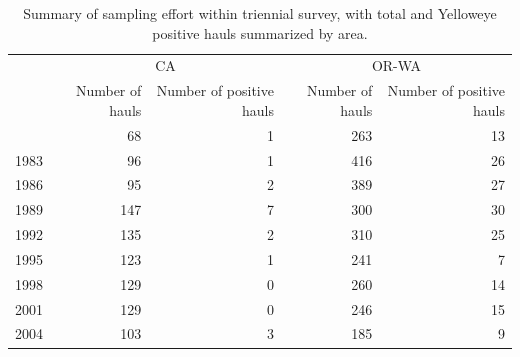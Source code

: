 \documentclass[
]{scrartcl}
\begin{document}
\begin{longtable}{l|rrrr}

\caption{\label{tbl-sampling-effort-triennial}Summary of sampling effort
within triennial survey, with total and Yelloweye positive hauls
summarized by area.}

\tabularnewline

\toprule
 & \multicolumn{2}{c}{CA} & \multicolumn{2}{c}{OR-WA} \\ 
\cmidrule(lr){2-3} \cmidrule(lr){4-5}
 & Number of hauls & Number of positive hauls & Number of hauls & Number of positive hauls \\ 
\midrule\addlinespace[2.5pt]
1980 & 68 & 1 & 263 & 13 \\ 
1983 & 96 & 1 & 416 & 26 \\ 
1986 & 95 & 2 & 389 & 27 \\ 
1989 & 147 & 7 & 300 & 30 \\ 
1992 & 135 & 2 & 310 & 25 \\ 
1995 & 123 & 1 & 241 & 7 \\ 
1998 & 129 & 0 & 260 & 14 \\ 
2001 & 129 & 0 & 246 & 15 \\ 
2004 & 103 & 3 & 185 & 9 \\ 
\bottomrule

\end{longtable}

\endgroup

\newpage{}

\begingroup
\fontsize{9.0pt}{10.8pt}\selectfont
\end{document}
